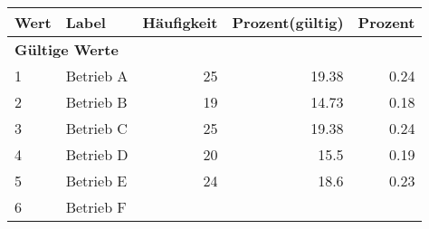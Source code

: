      \begin{longtable}{lXrrr}
     \toprule
     \textbf{Wert} & \textbf{Label} & \textbf{Häufigkeit} & \textbf{Prozent(gültig)} & \textbf{Prozent} \\
     \endhead
     \midrule
     \multicolumn{5}{l}{\textbf{Gültige Werte}}\\

     1 &
     \multicolumn{1}{X}{ Betrieb A   } &


       \num{25} &
       \num[round-mode=places,round-precision=2]{19,38} &
         \num[round-mode=places,round-precision=2]{0,24} \\

     2 &
     \multicolumn{1}{X}{ Betrieb B   } &


       \num{19} &
       \num[round-mode=places,round-precision=2]{14,73} &
         \num[round-mode=places,round-precision=2]{0,18} \\

     3 &
     \multicolumn{1}{X}{ Betrieb C   } &


       \num{25} &
       \num[round-mode=places,round-precision=2]{19,38} &
         \num[round-mode=places,round-precision=2]{0,24} \\

     4 &
     \multicolumn{1}{X}{ Betrieb D   } &


       \num{20} &
       \num[round-mode=places,round-precision=2]{15,5} &
         \num[round-mode=places,round-precision=2]{0,19} \\

     5 &
     \multicolumn{1}{X}{ Betrieb E   } &


       \num{24} &
       \num[round-mode=places,round-precision=2]{18,6} &
         \num[round-mode=places,round-precision=2]{0,23} \\

     6 &
     \multicolumn{1}{X}{ Betrieb F   } &



\end{longtable}
